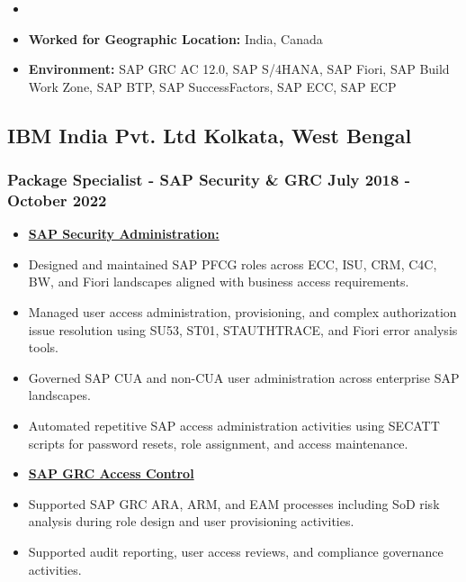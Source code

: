 \documentclass[10pt]{article}
\begin{document}
		
 \begin{itemize}
        \item[]  
        	\item[\ding{226}] \textbf {Worked for Geographic Location:} India, Canada
        	\item[] \textbf {Environment:} SAP GRC AC 12.0, SAP S/4HANA, SAP Fiori, SAP Build Work Zone, SAP BTP, SAP SuccessFactors, SAP ECC, SAP ECP

    \end{itemize}

    

\titlerule {\ }{}{}

\subsection{IBM India Pvt. Ltd \hfill \normalfont Kolkata, West Bengal}
\subsubsection{Package Specialist - SAP Security \& GRC \hfill  July 2018 - October 2022 \\}

	\begin{itemize}
		\small
     		\item[] \textbf{\underline{SAP Security Administration:}} 
			\item Designed and maintained SAP PFCG roles across ECC, ISU, CRM, C4C, BW, and Fiori landscapes aligned with business access requirements.
			\item Managed user access administration, provisioning, and complex authorization issue resolution using SU53, ST01, STAUTHTRACE, and Fiori error analysis tools.
			\item Governed SAP CUA and non-CUA user administration across enterprise SAP landscapes.
			\item Automated repetitive SAP access administration activities using SECATT scripts for password resets, role assignment, and access maintenance.
	\end{itemize}

	\begin{itemize}
		\small
     		\item[] \textbf{\underline{SAP GRC Access Control}} 
		 	\item Supported SAP GRC ARA, ARM, and EAM processes including SoD risk analysis during role design and user provisioning activities.
			\item Supported audit reporting, user access reviews, and compliance governance activities.
	\end{itemize}
\end{document}
